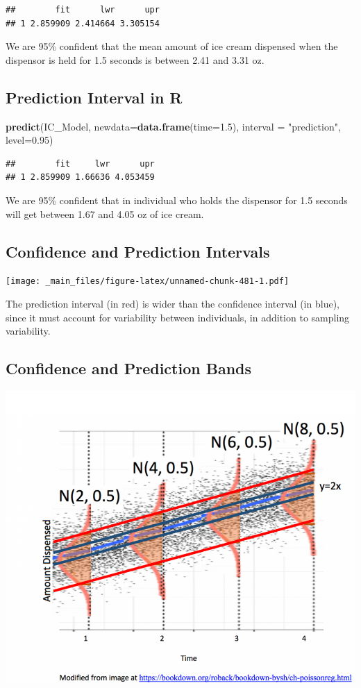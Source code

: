 \documentclass[]{book}
\newenvironment{Shaded}{\begin{snugshade}}{\end{snugshade}}
\newcommand{\KeywordTok}[1]{\textcolor[rgb]{0.13,0.29,0.53}{\textbf{#1}}}
\newcommand{\DataTypeTok}[1]{\textcolor[rgb]{0.13,0.29,0.53}{#1}}
\newcommand{\FloatTok}[1]{\textcolor[rgb]{0.00,0.00,0.81}{#1}}
\newcommand{\StringTok}[1]{\textcolor[rgb]{0.31,0.60,0.02}{#1}}
\newcommand{\NormalTok}[1]{#1}
\begin{document}
\begin{verbatim}
##        fit      lwr      upr
## 1 2.859909 2.414664 3.305154
\end{verbatim}

We are 95\% confident that the mean amount of ice cream dispensed when
the dispensor is held for 1.5 seconds is between 2.41 and 3.31 oz.

\subsection{Prediction Interval in R}\label{prediction-interval-in-r}

\begin{Shaded}
\begin{Highlighting}[]
\KeywordTok{predict}\NormalTok{(IC_Model, }\DataTypeTok{newdata=}\KeywordTok{data.frame}\NormalTok{(}\DataTypeTok{time=}\FloatTok{1.5}\NormalTok{), }\DataTypeTok{interval =} \StringTok{"prediction"}\NormalTok{, }\DataTypeTok{level=}\FloatTok{0.95}\NormalTok{)}
\end{Highlighting}
\end{Shaded}

\begin{verbatim}
##        fit     lwr      upr
## 1 2.859909 1.66636 4.053459
\end{verbatim}

We are 95\% confident that in individual who holds the dispensor for 1.5
seconds will get between 1.67 and 4.05 oz of ice cream.

\subsection{Confidence and Prediction
Intervals}\label{confidence-and-prediction-intervals}

\texttt{[image: \_main\_files/figure-latex/unnamed-chunk-481-1.pdf]}

The prediction interval (in red) is wider than the confidence interval
(in blue), since it must account for variability between individuals, in
addition to sampling variability.

\subsection{Confidence and Prediction
Bands}\label{confidence-and-prediction-bands}

\includegraphics[width=0.75\linewidth]{C_P_Band}
\end{document}
